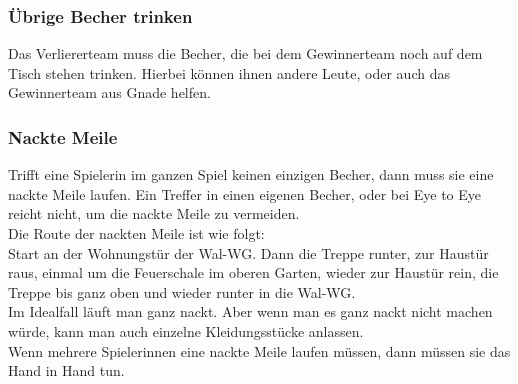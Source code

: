 \documentclass[a5paper, 12pt]{book}
\begin{document}
\subsubsection{Übrige Becher trinken}\label{subsub:übrigebechertrinken}
Das Verliererteam muss die Becher, die bei dem Gewinnerteam noch auf dem Tisch stehen trinken. Hierbei können ihnen andere Leute, oder auch das Gewinnerteam aus Gnade helfen.
\subsubsection{Nackte Meile}\label{subsub:nacktemeile}
Trifft eine Spielerin im ganzen Spiel keinen einzigen Becher, dann muss sie eine nackte Meile laufen. Ein Treffer in einen eigenen Becher, oder bei Eye to Eye reicht nicht, um die nackte Meile zu vermeiden.\\
Die Route der nackten Meile ist wie folgt:\\
Start an der Wohnungstür der Wal-WG\texttrademark. Dann die Treppe runter, zur Haustür raus, einmal um die Feuerschale im oberen Garten, wieder zur Haustür rein, die Treppe bis ganz oben und wieder runter in die Wal-WG\texttrademark.\\
Im Idealfall läuft man ganz nackt. Aber wenn man es ganz nackt nicht machen würde, kann man auch einzelne Kleidungsstücke anlassen.\\
Wenn mehrere Spielerinnen eine nackte Meile laufen müssen, dann müssen sie das Hand in Hand tun. 
\end{document}
